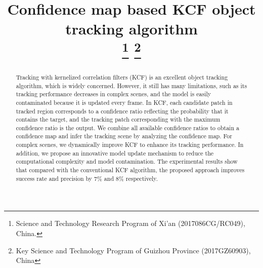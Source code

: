\documentclass[conference]{IEEEtran}
\begin{document}
\title{Confidence map based KCF object tracking algorithm\\
\thanks{Science and Technology Research Program of Xi'an (2017086CG/RC049), China.}
\thanks{Key Science and Technology Program of Guizhou Province (2017GZ60903), China}
}

\author{
\and
{}
\and
{}
}

\maketitle

\begin{abstract}
Tracking with kernelized correlation filters (KCF) is an excellent object tracking algorithm, which is widely concerned.
However, it still has many limitations, such as its tracking performance decreases in complex scenes, and the model is easily contaminated because it is updated every frame.
In KCF, each candidate patch in tracked region corresponds to a confidence ratio reflecting the probability that it contains the target, and the tracking patch corresponding with the maximum confidence ratio is the output.
We combine all available confidence ratios to obtain a confidence map and infer the tracking scene by analyzing the confidence map.
For complex scenes, we dynamically improve KCF to enhance its tracking performance.
In addition, we propose an innovative model update mechanism to reduce the computational complexity and model contamination. 
The experimental results show that compared with the conventional KCF algorithm, the proposed approach improves success rate and precision by 7\% and 8\% respectively.
\end{abstract}
\end{document}
